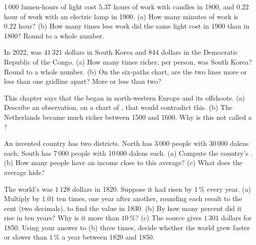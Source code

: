 \begin{exercise}[$\star\star$]\label{exo:g6:living-standards:6}
1\,000 lumen-hours of light cost $5.37$ hours of work with candles in 1800, and
$0.22$ hour of work with an electric lamp in 1900. (a) How many minutes of work
is $0.22$ hour? (b) How many times less work did the same light cost in 1900
than in 1800? Round to a whole number.
\end{exercise}

\begin{exercise}[$\star\star$]\label{exo:g6:living-standards:7}
In 2022,  was $41\,321$ dollars in South Korea and $844$ dollars
in the Democratic Republic of the Congo. (a) How many times richer, per person,
was South Korea? Round to a whole number. (b) On the six-paths chart, are the two
lines more or less than one gridline apart? More or less than two?
\end{exercise}

\begin{exercise}[$\star\star$]\label{exo:g6:living-standards:8}
This chapter says that the  began in north-western Europe and its
offshoots. (a) Describe an observation, on a chart of , that
would contradict this. (b) The Netherlands became much richer between 1500 and
1600. Why is this not called a ?
\end{exercise}

\begin{exercise}[$\star\star$]\label{exo:g6:living-standards:9}
An invented country has two districts. North has 3\,000 people with
30\,000 dalens each; South has 7\,000 people with 10\,000 dalens each.
(a) Compute the country's . (b) How many people have an
income close to this average? (c) What does the average hide?
\end{exercise}

\begin{exercise}[$\star\star\star$]\label{exo:g6:living-standards:10}
The world's  was $1\,128$ dollars in 1820. Suppose it had
risen by $1\,\%$ every year. (a) Multiply by $1.01$ ten times, one year after
another, rounding each result to the cent (two decimals), to find the value in
1830. (b) By how many percent did it rise in ten years? Why is it more than
$10\,\%$? (c) The source gives $1\,301$ dollars for 1850. Using your answer to
(b) three times, decide whether the world grew faster or slower than $1\,\%$ a
year between 1820 and 1850.
\end{exercise}

